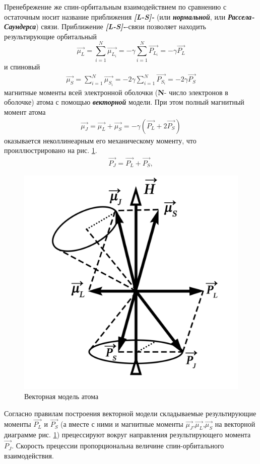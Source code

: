 Пренебрежение же спин-орбитальным взаимодействием по сравнению с остаточным носит название приближения {\itshape\textbf{[L-S]-}} (или {\itshape\textbf{нормальной}}, или {\itshape\textbf{Рассела-Саундерса}}) связи. Приближение {\itshape\textbf{[L-S]-}}-связи позволяет находить результирующие орбитальный
\begin{equation} 
\label{eq:14} 
\vec{\mu_L} = \sum_{i=1}^N \vec{\mu_{L_{i}}}=
-\gamma \sum_{i=1}^N\vec{P_{L_i}}=-\gamma \vec{P_L}
\end{equation}
и спиновый
\begin{gather} 
\label{eq:15} 
\vec{\mu_S} = \sum_{i=1}^N \vec{\mu_{S_{i}}}=-2\gamma \sum_{i=1}^N \vec{P_{S_i}}=-2\gamma \vec{P_S}
\end{gather}
магнитные моменты всей электронной оболочки (\textbf{N}- число электронов в оболочке) атома с помощью {\itshape\textbf{векторной}} модели. При этом полный магнитный момент атома
\begin{gather} 
\label{eq:16} 
\vec{\mu_J} =\vec{\mu_L}+\vec{\mu_S}=-\gamma(\vec{P_L}+2\vec{P_S})
\end{gather}
оказывается неколлинеарным его механическому моменту, что проиллюстрировано на рис. \ref{fig:2}.
\begin{gather} 
\label{eq:17} 
\vec{P_J}=\vec{P_L}+\vec{P_S},
\end{gather}

\begin{figure}[H]
    \centering
    \includegraphics[width=.7\textwidth]{fig/fig2.pdf}
    \caption{Векторная модель атома}    
    \label{fig:2}
\end{figure}


Согласно правилам построения векторной модели складываемые результирующие моменты $\vec{P_L}$ и $\vec{P_S}$ (а вместе с ними и магнитные моменты $\vec{\mu_J}$,$\vec{\mu_L}$,$\vec{\mu_S}$ на векторной диаграмме рис. \ref{fig:2}) прецессируют вокруг направления результирующего момента $\vec{P_J}$. Скорость прецессии пропорциональна величине спин-орбитального взаимодействия.

